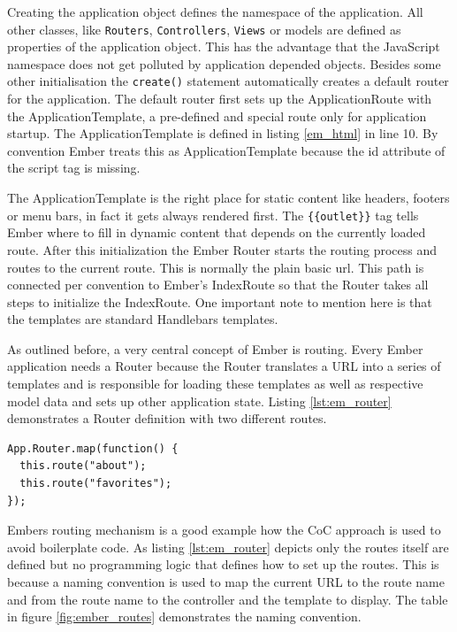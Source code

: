 Creating the application object defines the namespace of the application.
All other classes, like \texttt{Routers}, \texttt{Controllers}, \texttt{Views} or models are defined as properties of the application object.
This has the advantage that the JavaScript namespace does not get polluted by application depended objects.
Besides some other initialisation the \texttt{create()} statement automatically creates a default router for the application.
The default router first sets up the ApplicationRoute with the ApplicationTemplate, a pre-defined and special route only for application startup.
The ApplicationTemplate is defined in listing \ref{em_html} in line 10.
By convention Ember treats this as ApplicationTemplate because the id attribute of the script tag is missing.

The ApplicationTemplate is the right place for static content like headers, footers or menu bars, in fact it gets always rendered first.
The \texttt{\{\{outlet\}\}} tag tells Ember where to fill in dynamic content that depends on the currently loaded route.
After this initialization the Ember Router starts the routing process and routes to the current route.
This is normally the plain basic url.
This path is connected per convention to Ember's IndexRoute so that the Router takes all steps to initialize the IndexRoute.
One important note to mention here is that the templates are standard Handlebars templates.

As outlined before, a very central concept of Ember is routing.
Every Ember application needs a Router because the Router translates a URL into a series of templates and is responsible for loading these templates as well as respective model data and sets up other application state.
Listing \ref{lst:em_router} demonstrates a Router definition with two different routes.

\begin{lstlisting}[label=lst:em_router,caption=Router Defintion in Ember]
App.Router.map(function() {
  this.route("about");
  this.route("favorites");
});
\end{lstlisting}

Embers routing mechanism is a good example how the CoC approach is used to avoid boilerplate code. As listing \ref{lst:em_router} depicts only the routes itself are defined but no programming logic that defines how to set up the routes. 
This is because a naming convention is used to map the current URL to the route name and from the route name to the controller and the template to display.
The table in figure \ref{fig:ember_routes} demonstrates the naming convention.

